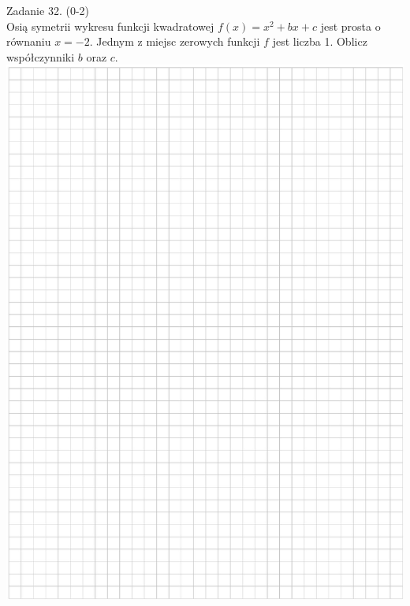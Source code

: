 \documentclass[10pt]{article}
\begin{document}
Zadanie 32. (0-2)\\
Osią symetrii wykresu funkcji kwadratowej \(f(x)=x^{2}+b x+c\) jest prosta o równaniu \(x=-2\). Jednym z miejsc zerowych funkcji \(f\) jest liczba 1. Oblicz współczynniki \(b\) oraz \(c\).\\
\includegraphics[max width=\textwidth, center]{2024_11_21_0a35d272448d5080a489g-24}
\end{document}
